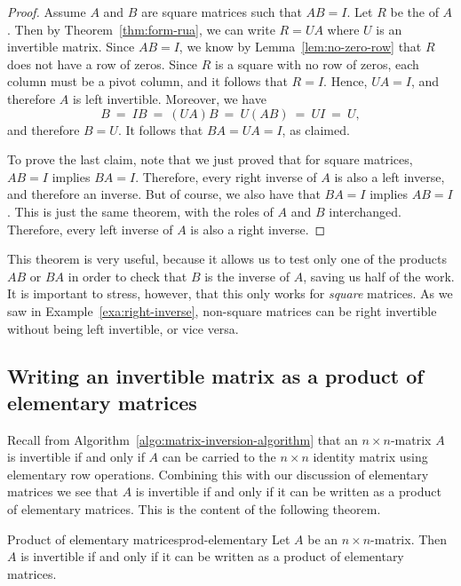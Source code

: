 \documentclass{ximera}
\begin{document}
\begin{proof}
  Assume $A$ and $B$ are square matrices such that $AB=I$. Let $R$ be
  the {\rref} of $A$. Then by Theorem~\ref{thm:form-rua}, we can write
  $R=UA$ where $U$ is an invertible matrix. Since $AB=I$, we know by
  Lemma~\ref{lem:no-zero-row} that $R$ does not have a row of
  zeros. Since $R$ is a square {\rref} with no row of zeros, each
  column must be a pivot column, and it follows that $R=I$. Hence,
  $UA=I$, and therefore $A$ is left invertible. Moreover, we have
  \begin{equation*}
    B ~=~ IB ~=~ (UA)B ~=~ U(AB) ~=~ UI ~=~ U,
  \end{equation*}
  and therefore $B=U$. It follows that $BA=UA=I$, as claimed.

  To prove the last claim, note that we just proved that for square
  matrices, $AB=I$ implies $BA=I$. Therefore, every right inverse of
  $A$ is also a left inverse, and therefore an inverse. But of course,
  we also have that $BA=I$ implies $AB=I$. This is just the same
  theorem, with the roles of $A$ and $B$ interchanged. Therefore,
  every left inverse of $A$ is also a right inverse.
\end{proof}

This theorem is very useful, because it allows us to test only one of
the products $AB$ or $BA$ in order to check that $B$ is the inverse of
$A$, saving us half of the work. It is important to stress, however,
that this only works for {\em square} matrices. As we saw in
Example~\ref{exa:right-inverse}, non-square matrices can be right
invertible without being left invertible, or vice versa.

\subsection{Writing an invertible matrix as a product of elementary matrices}

Recall from Algorithm~\ref{algo:matrix-inversion-algorithm} that an
$n\times n$-matrix $A$ is invertible if and only if $A$ can be carried
to the $n\times n$ identity matrix using elementary row
operations. Combining this with our discussion of elementary matrices
we see that $A$ is invertible if and only if it can be written as a
product of elementary matrices. This is the content of the following
theorem.

\begin{theorem}{Product of elementary matrices}{prod-elementary}
  Let $A$ be an $n \times n$-matrix. Then $A$ is invertible if and
  only if it can be written as a product of elementary matrices.
\end{theorem}
\end{document}
